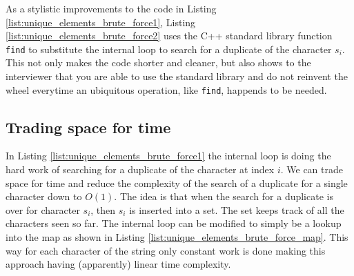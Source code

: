 \begin{minipage}{\linewidth}
	
\end{minipage}

As a stylistic improvements to the code in Listing \ref{list:unique_elements_brute_force1}, Listing
\ref{list:unique_elements_brute_force2}  uses the C++ standard library function \texttt{find} to
substitute the internal loop to search for a duplicate of the character $s_i$. 
This not only makes the code shorter and cleaner, but also shows to the interviewer that you are
able to use the standard library and do not reinvent the wheel everytime an ubiquitous operation, like \texttt{find}, happends to be needed.

\begin{minipage}{\linewidth}
	
\end{minipage}

\subsection{Trading space for time}
In Listing \ref{list:unique_elements_brute_force1} the internal loop is doing the hard work of
searching for a duplicate of the character at index $i$. 
We can trade space for time and reduce the complexity of the search of a duplicate for a single character down to $O(1)$.
The idea is that when the search for a duplicate is over for character $s_i$, then $s_i$ is inserted into a set.
The set keeps track of all the characters seen so far. The internal loop can be modified to simply be a lookup into the
map as shown in Listing \ref{list:unique_elements_brute_force_map}. This way for each character of the string only constant work is done making this approach having (apparently) linear time complexity.

\begin{minipage}{\linewidth}
	
\end{minipage}

